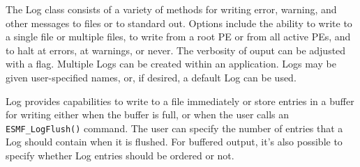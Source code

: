 %


The Log class consists of a variety of methods for writing error, warning, 
and other messages to files or to standard out.  Options include the ability 
to write to a single file or multiple files, to write from a root PE or 
from all active PEs, and to halt at errors, at warnings, or never.  The 
verbosity of ouput can be adjusted with a flag.  Multiple 
Logs can be created within an application.  Logs may be given
user-specified names, or, if desired, a default Log can 
be used.  

Log provides capabilities to write to a file immediately or store entries 
in a buffer for writing either when the buffer is full, or when the user
calls an {\tt ESMF\_LogFlush()} command.  The user can specify the number 
of entries that a Log should contain when it is flushed.  For buffered output, 
it's also possible to specify whether Log entries should be ordered or not.  


